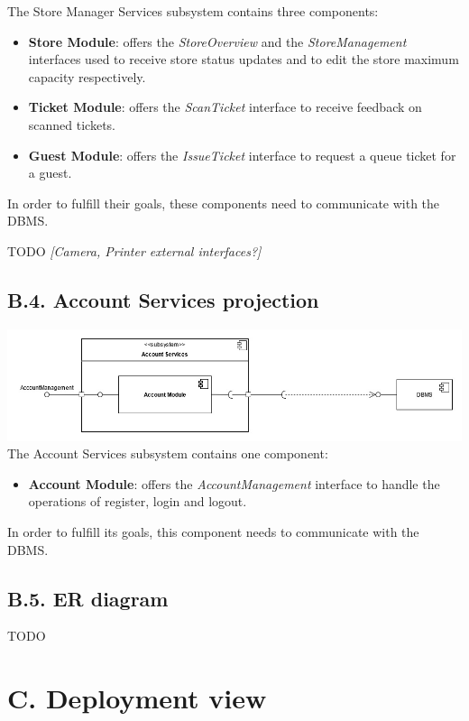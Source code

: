 The Store Manager Services subsystem contains three components:
\begin{itemize}
\item
    \textbf{Store Module}: offers the \emph{StoreOverview} and the
    \emph{StoreManagement} interfaces used to receive store status updates and to edit the store maximum capacity respectively.
\item
    \textbf{Ticket Module}: offers the \emph{ScanTicket} interface to receive feedback on scanned tickets.
\item
    \textbf{Guest Module}: offers the \emph{IssueTicket} interface to request a queue ticket for a guest.
\end{itemize}

In order to fulfill their goals, these components need to communicate with the DBMS.

TODO \emph{[Camera, Printer external interfaces?]}

\subsection{B.4. Account Services projection}

\includegraphics{assets/dd/components_view/account_services_projection}
The Account Services subsystem contains one component:
\begin{itemize}
\item
    \textbf{Account Module}: offers the \emph{AccountManagement} interface to handle the operations of register, login and logout.
\end{itemize}

In order to fulfill its goals, this component needs to communicate with the DBMS.

\subsection{B.5. ER diagram}

TODO

\section{C. Deployment view}

